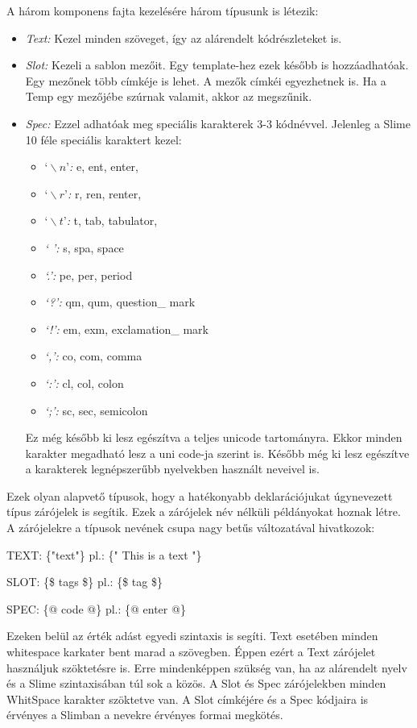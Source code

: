 A három komponens fajta kezelésére három típusunk is létezik:
\begin{itemize}
\item \emph{Text:} 
Kezel minden szöveget, így az alárendelt kódrészleteket is.
\item \emph{Slot:} 
Kezeli a sablon mezőit.
Egy template-hez ezek később is hozzáadhatóak.
Egy mezőnek több címkéje is lehet.
A mezők címkéi egyezhetnek is.
Ha a Temp egy mezőjébe szúrnak valamit, akkor az megszűnik.
\item \emph{Spec:} 
Ezzel adhatóak meg speciális karakterek 3-3 kódnévvel.
Jelenleg a Slime 10 féle speciális karaktert kezel:
\begin{itemize}
\item \emph{$‘\backslash n’$:} e, ent, enter, 
\item \emph{$‘\backslash r’$:} r, ren, renter, 
\item \emph{$‘\backslash t’$:} t, tab, tabulator, 
\item \emph{‘ ’:} s, spa, space 
\item \emph{‘.’:} pe, per, period 
\item \emph{‘?’:} qm, qum, question\_ mark 
\item \emph{‘!’:} em, exm, exclamation\_ mark 
\item \emph{‘,’:} co, com, comma
\item \emph{‘:’:} cl, col, colon 
\item \emph{‘;’:} sc, sec, semicolon
\end{itemize}
Ez még később ki lesz egészítva a teljes unicode tartományra. Ekkor minden karakter megadható lesz a uni code-ja szerint is.
Később még ki lesz egészítve a karakterek legnépszerűbb nyelvekben használt neveivel is.
\end{itemize}

Ezek olyan alapvető típusok, hogy a hatékonyabb deklarációjukat úgynevezett típus zárójelek is segítik. 
Ezek a zárójelek név nélküli példányokat hoznak létre.
A zárójelekre a típusok nevének csupa nagy betűs változatával hivatkozok:

TEXT: \{"text"\} pl.: \{" This is a text "\}

SLOT: \{\$ tags \$\} pl.: \{\$ tag \$\}

SPEC: \{@ code @\} pl.: \{@ enter @\}

Ezeken belül az érték adást egyedi szintaxis is segíti.
Text esetében minden whitespace karkater bent marad a szövegben.
Éppen ezért a Text zárójelet használjuk szöktetésre is.
Erre mindenképpen szükség van, ha az alárendelt nyelv és a Slime szintaxisában túl sok a közös.
A Slot és Spec zárójelekben minden WhitSpace karakter szöktetve van.
A Slot címkéjére és a Spec kódjaira is érvényes a Slimban a nevekre érvényes formai megkötés.

